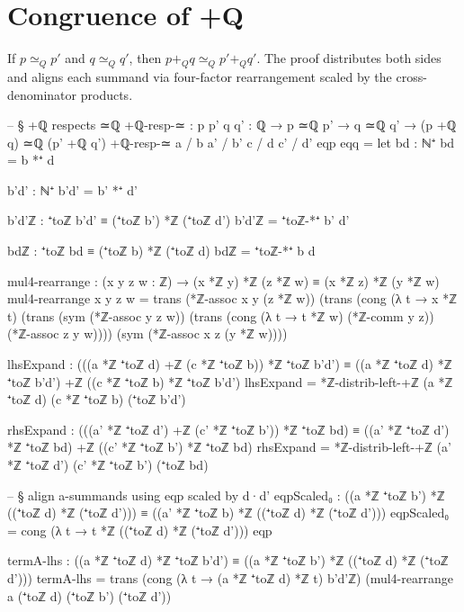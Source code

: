 \documentclass[11pt,a4paper]{book}
\def\mathbb#1{#1}%
\def\texorpdfstring#1#2{#2}%
\begin{document}
\section{Congruence of \texorpdfstring{$+_{\mathbb{Q}}$}{+Q}}

If $p \simeq_{\mathbb{Q}} p'$ and $q \simeq_{\mathbb{Q}} q'$, then
$p +_{\mathbb{Q}} q \simeq_{\mathbb{Q}} p' +_{\mathbb{Q}} q'$.  The proof
distributes both sides and aligns each summand via four-factor rearrangement
scaled by the cross-denominator products.

\begin{code}
-- § +ℚ respects ≃ℚ
+ℚ-resp-≃ : {p p' q q' : ℚ} → p ≃ℚ p' → q ≃ℚ q' → (p +ℚ q) ≃ℚ (p' +ℚ q')
+ℚ-resp-≃ {a / b} {a' / b'} {c / d} {c' / d'} eqp eqq =
  let
    bd : ℕ⁺
    bd = b *⁺ d

    b'd' : ℕ⁺
    b'd' = b' *⁺ d'

    b'd'ℤ : ⁺toℤ b'd' ≡ (⁺toℤ b') *ℤ (⁺toℤ d')
    b'd'ℤ = ⁺toℤ-*⁺ b' d'

    bdℤ : ⁺toℤ bd ≡ (⁺toℤ b) *ℤ (⁺toℤ d)
    bdℤ = ⁺toℤ-*⁺ b d

    mul4-rearrange : (x y z w : ℤ) → (x *ℤ y) *ℤ (z *ℤ w) ≡ (x *ℤ z) *ℤ (y *ℤ w)
    mul4-rearrange x y z w =
      trans
        (*ℤ-assoc x y (z *ℤ w))
        (trans
          (cong (λ t → x *ℤ t)
            (trans
              (sym (*ℤ-assoc y z w))
              (trans
                (cong (λ t → t *ℤ w) (*ℤ-comm y z))
                (*ℤ-assoc z y w))))
          (sym (*ℤ-assoc x z (y *ℤ w))))

    lhsExpand :
      (((a *ℤ ⁺toℤ d) +ℤ (c *ℤ ⁺toℤ b)) *ℤ ⁺toℤ b'd')
        ≡
      ((a *ℤ ⁺toℤ d) *ℤ ⁺toℤ b'd') +ℤ ((c *ℤ ⁺toℤ b) *ℤ ⁺toℤ b'd')
    lhsExpand = *ℤ-distrib-left-+ℤ (a *ℤ ⁺toℤ d) (c *ℤ ⁺toℤ b) (⁺toℤ b'd')

    rhsExpand :
      (((a' *ℤ ⁺toℤ d') +ℤ (c' *ℤ ⁺toℤ b')) *ℤ ⁺toℤ bd)
        ≡
      ((a' *ℤ ⁺toℤ d') *ℤ ⁺toℤ bd) +ℤ ((c' *ℤ ⁺toℤ b') *ℤ ⁺toℤ bd)
    rhsExpand = *ℤ-distrib-left-+ℤ (a' *ℤ ⁺toℤ d') (c' *ℤ ⁺toℤ b') (⁺toℤ bd)

    -- § align a-summands using eqp scaled by d·d'
    eqpScaled₀ : ((a *ℤ ⁺toℤ b') *ℤ ((⁺toℤ d) *ℤ (⁺toℤ d'))) ≡ ((a' *ℤ ⁺toℤ b) *ℤ ((⁺toℤ d) *ℤ (⁺toℤ d')))
    eqpScaled₀ = cong (λ t → t *ℤ ((⁺toℤ d) *ℤ (⁺toℤ d'))) eqp

    termA-lhs : ((a *ℤ ⁺toℤ d) *ℤ ⁺toℤ b'd') ≡ ((a *ℤ ⁺toℤ b') *ℤ ((⁺toℤ d) *ℤ (⁺toℤ d')))
    termA-lhs =
      trans
        (cong (λ t → (a *ℤ ⁺toℤ d) *ℤ t) b'd'ℤ)
        (mul4-rearrange a (⁺toℤ d) (⁺toℤ b') (⁺toℤ d'))


\end{code}
\end{document}
